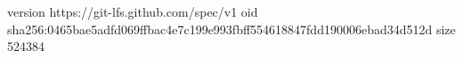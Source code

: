 version https://git-lfs.github.com/spec/v1
oid sha256:0465bae5adfd069ffbac4e7c199e993fbff554618847fdd190006ebad34d512d
size 524384
